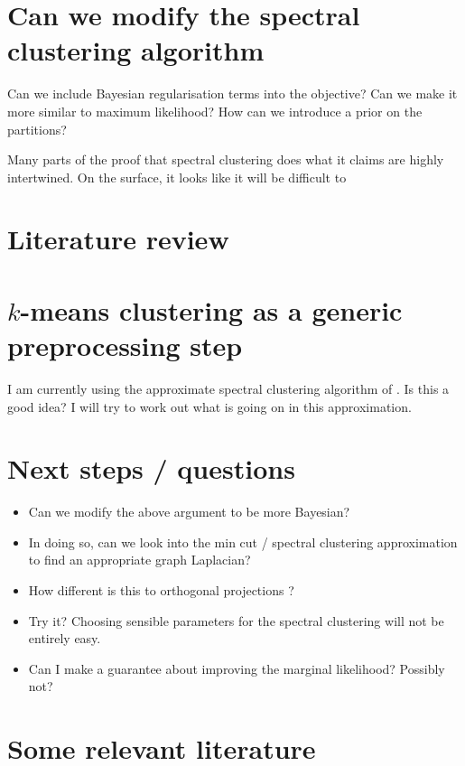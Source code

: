 \documentclass{article}
\numberwithin{equation}{section}
\numberwithin{thm}{section}
\begin{document}
\section{Can we modify the spectral clustering algorithm}

Can we include Bayesian regularisation terms into the objective?
Can we make it more similar to maximum likelihood?
How can we introduce a prior on the partitions?

Many parts of the proof that spectral clustering does what it claims are highly intertwined.
On the surface, it looks like it will be difficult to 

\section{Literature review}


\cite{Griffiths2011}
\cite{Luxburg2007}
\cite{Cui2007}
\cite{Niu2010}
\cite{Niu2011}
\cite{Niu2012}

\section{$k$-means clustering as a generic preprocessing step}

I am currently using the approximate spectral clustering algorithm of \cite{Yan2009}.
Is this a good idea?
I will try to work out what is going on in this approximation.

\section{Next steps / questions}
\begin{itemize}
\item Can we modify the above argument to be more Bayesian?
\item In doing so, can we look into the min cut / spectral clustering approximation to find an appropriate graph Laplacian?
\item How different is this to orthogonal projections \citep{Cui2007}?
\item Try it? Choosing sensible parameters for the spectral clustering will not be entirely easy.
\item Can I make a guarantee about improving the marginal likelihood? Possibly not?
\end{itemize}

\section{Some relevant literature}


\small{

%

}
\end{document}
